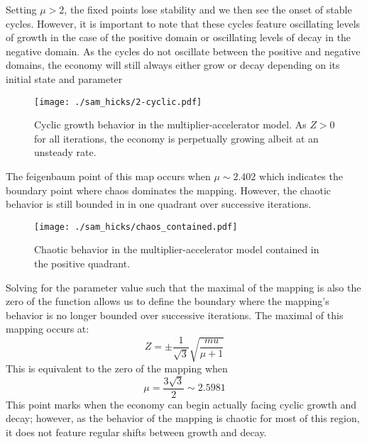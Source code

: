 Setting $\mu>2$, the fixed points lose stability and we then see the onset of stable cycles. However, it is important to note that these cycles feature oscillating levels of growth in the case of the positive domain or oscillating levels of decay in the negative domain. As the cycles do not oscillate between the positive and negative domains, the economy will still always either grow or decay depending on its initial state and parameter

\begin{figure}
    \centering
    \texttt{[image: ./sam\_hicks/2-cyclic.pdf]}
    \caption{Cyclic growth behavior in the multiplier-accelerator model. As $Z>0$ for all iterations, the economy is perpetually growing albeit at an unsteady rate.}
\end{figure}
The feigenbaum point of this map occurs when $\mu\sim2.402$ which indicates the boundary point where chaos dominates the mapping. However, the chaotic behavior is still bounded in in one quadrant over successive iterations.
\begin{figure}
    \centering
    \texttt{[image: ./sam\_hicks/chaos\_contained.pdf]}
    \caption{Chaotic behavior in the multiplier-accelerator model contained in the positive quadrant.}
\end{figure}
Solving for the parameter value such that the maximal of the mapping is also the zero of the function allows us to define the boundary where the mapping's behavior is no longer bounded over successive iterations. The maximal of this mapping occurs at:
\begin{equation*}
    Z=\pm\frac{1}{\sqrt 3}\sqrt{\frac{mu}{\mu+1}}
\end{equation*}
This is equivalent to the zero of the mapping when 
\begin{equation*}
    \mu=\frac{3\sqrt{3}}{2}\sim2.5981
\end{equation*}
This point marks when the economy can begin actually facing cyclic growth and decay; however, as the behavior of the mapping is chaotic for most of this region, it does not feature regular shifts between growth and decay.

